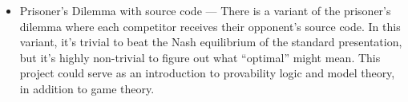 \documentclass{article}
\begin{document}
\begin{itemize}
  \item Prisoner's Dilemma with source code --- There is a variant of the prisoner's dilemma where each competitor receives their opponent's source code.  In this variant, it's trivial to beat the Nash equilibrium of the standard presentation, but it's highly non-trivial to figure out what ``optimal'' might mean.  This project could serve as an introduction to provability logic and model theory, in addition to game theory.
\end{itemize}
\end{document}

